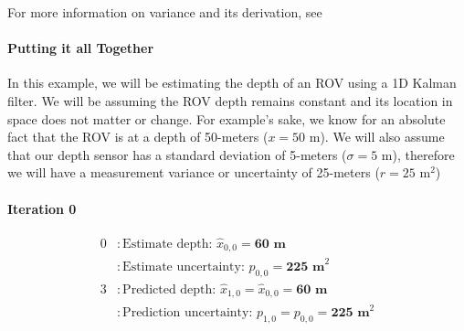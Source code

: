         For more information on variance and its derivation, see 

        \paragraph*{Putting it all Together}



        \begin{example}
            In this example, we will be estimating the depth of an ROV using a 1D Kalman filter.
            We will be assuming the ROV depth remains constant and its location in space does not matter or change.
            For example's sake, we know for an absolute fact that the ROV is at a depth of 50-meters ($x=50 \text{ m}$).
            We will also assume that our depth sensor has a standard deviation of 5-meters ($\sigma=5 \text{ m}$), therefore we will have a measurement variance or uncertainty of 25-meters ($r=25 \text{ m}^2$)

            \paragraph*{Iteration 0}
            \begin{equation*}
                \begin{aligned}
                    0 &: \text{Estimate depth: } \hat{x}_{0,0} = \textbf{60 m} \\
                      &: \text{Estimate uncertainty: } p_{0,0} = \textbf{225 m}^2 \\
                    3 &: \text{Predicted depth: } \hat{x}_{1,0} = \hat{x}_{0,0} = \textbf{60 m} \\
                      &: \text{Prediction uncertainty: } p_{1,0} = p_{0,0} = \textbf{225 m}^2 \\
                \end{aligned}
            \end{equation*}


\end{example}
